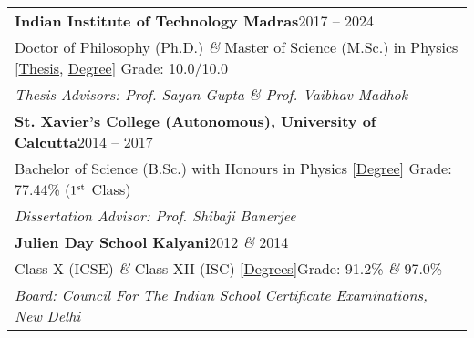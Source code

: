 
\noindent
\begin{tabular}{@{} m{18.5cm}}
\textbf{Indian Institute of Technology Madras}\hfill 2017 -- 2024\\
Doctor of Philosophy (Ph.D.) \textit{\&} Master of Science (M.Sc.) in Physics [\href{https://shodhganga.inflibnet.ac.in/handle/10603/609844}{Thesis}, \href{https://drive.google.com/file/d/1e_EdV3adnDxSkRCMAQGF4_j8DAEQHmok/view?usp=sharing}{Degree}] \hfill Grade: 10.0/10.0\\
\textit{Thesis Advisors: Prof. Sayan Gupta \& Prof. Vaibhav Madhok}\\[0.3cm]

\textbf{St. Xavier's College (Autonomous), University of Calcutta}\hfill 2014 -- 2017\\
Bachelor of Science (B.Sc.) with Honours in Physics [\href{https://drive.google.com/file/d/1kzH1EiCFbbcnvpbOTWJMMhiCC53tkvDD/view?usp=sharing}{Degree}] \hfill Grade: 77.44\% ($1^{\rm st}$ Class)\\
\textit{Dissertation Advisor: Prof. Shibaji Banerjee}\\[0.3cm]

\textbf{Julien Day School Kalyani}\hfill 2012 \textit{\&} 2014\\
Class X (ICSE) \textit{\&} Class XII (ISC) [\href{https://drive.google.com/file/d/1rBzB5cY0d9NKxEajnIj6dx8uzIBc41sh/view?usp=sharing}{Degrees}]\hfill Grade: 91.2\% \textit{\&} 97.0\%\\
\textit{Board: Council For The Indian School Certificate Examinations, New Delhi}
\end{tabular}